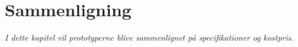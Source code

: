 \chapter{Sammenligning}\label{kap:sammenligning}

\emph{I dette kapitel vil prototyperne blive sammenlignet på specifikationer og kostpris.}